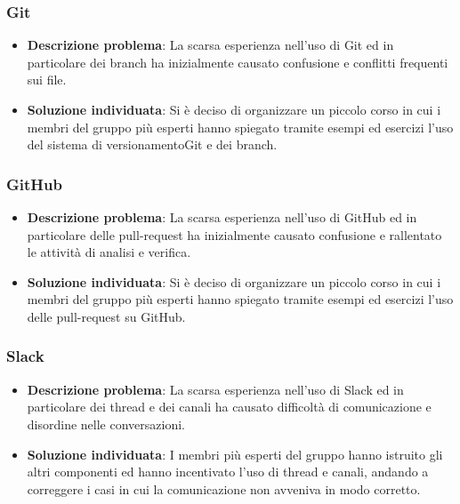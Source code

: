 	\subsubsection{Git}
		\begin{itemize}
			\item \textbf{Descrizione problema}: La scarsa esperienza nell'uso di Git ed in particolare dei branch ha inizialmente causato confusione e conflitti frequenti sui file.
			\item \textbf{Soluzione individuata}: Si è deciso di organizzare un piccolo corso in cui i membri del gruppo più esperti hanno spiegato tramite esempi ed esercizi l'uso del sistema di versionamento\glosp Git e dei branch. 
		\end{itemize}
	\subsubsection{GitHub}
		\begin{itemize}
		\item \textbf{Descrizione problema}: La scarsa esperienza nell'uso di GitHub ed in particolare delle pull-request ha inizialmente causato confusione e rallentato le attività di analisi e verifica.
		\item \textbf{Soluzione individuata}: Si è deciso di organizzare un piccolo corso in cui i membri del gruppo più esperti hanno spiegato tramite esempi ed esercizi l'uso delle pull-request su GitHub. 
		\end{itemize}
	\subsubsection{Slack}
		\begin{itemize}
			\item \textbf{Descrizione problema}: La scarsa esperienza nell'uso di Slack ed in particolare dei thread e dei canali ha causato difficoltà di comunicazione e disordine nelle conversazioni.
			\item \textbf{Soluzione individuata}: I membri più esperti del gruppo hanno istruito gli altri componenti ed hanno incentivato l'uso di thread e canali, andando a correggere i casi in cui la comunicazione non avveniva in modo corretto. 
		\end{itemize}